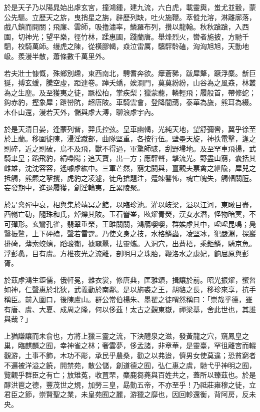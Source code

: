 \begin{pinyinscope}
於是天子乃以陽晁始出虖玄宮，撞鴻鍾，建九流，六白虎，載靈輿，蚩尤並轂，蒙公先驅。立歷天之旂，曳捎星之旃，辟歷列缺，吐火施鞭。萃傱允溶，淋離廓落，戲八鎮而開關；飛廉、雲師，吸撸潚率，鱗羅布列，攢以龍翰。秋秋蹌蹌，入西園，切神光；望平樂，徑竹林，蹂惠圃，踐蘭唐。舉烽烈火，轡者施披，方馳千駟，校騎萬師。缦虎之陳，從橫膠輵，猋泣雷厲，驞駍駖磕，洶洶旭旭，天動地岋。羨漫半散，蕭條數千萬里外。

若夫壯士慷慨，殊鄉別趣，東西南北，騁耆奔欲。癴蒼豨，跋犀犛，蹶浮麋。斮巨狿，搏玄蝯，騰空虛，距連卷。踔夭蟜，娭澗門，莫莫紛紛，山谷為之風猋，林叢為之生塵。及至獲夷之徒，蹶松柏，掌疾梨；獵蒙蘢，轔輕飛；履般首，帶修蛇；鉤赤豹，摼象犀；跇巒阬，超唐陂。車騎雲會，登降闇藹，泰華為旒，熊耳為綴。木仆山還，漫若天外，儲與虖大溥，聊浪虖宇內。

於是天清日晏，逢蒙列眥，羿氏控弦。皇車幽輵，光純天地，望舒彌轡，翼乎徐至於上蘭。移圍徙陳，浸淫蹴部，曲隊堅重，各按行伍。壁壘天旋，神抶電擊，逢之則碎，近之則破，鳥不及飛，獸不得過，軍驚師駭，刮野埽地。及至罕車飛揚，武騎聿皇；蹈飛豹，絹嘄陽；追天寶，出一方；應駍聲，擊流光。野盡山窮，囊括其雌雄，沈沈容容，遙噱虖紘中。三軍芒然，窮冘閼與，亶觀夫票禽之紲隃，犀兕之抵觸，熊羆之挐攫，虎豹之凌遽，徒角搶題注，蹙竦讋怖，魂亡魄失，觸輻關脰。妄發期中，進退履獲，創淫輪夷，丘累陵聚。

於是禽殫中衰，相與集於靖冥之館，以臨珍池。灌以岐梁，溢以江河，東瞰目盡，西暢亡劯，隨珠和氏，焯爍其陂。玉石嶜崟，眩燿青熒，漢女水潛，怪物暗冥，不可殫形。玄鸞孔雀，翡翠垂榮，王雎關關，鴻鴈嚶嚶，群娭虖其中，唣唣昆鳴；鳧鷖振鷺，上下砰磕，聲若雷霆。乃使文身之技，水格鱗蟲，凌堅冰，犯嚴淵，探巖排碕，薄索蛟螭，蹈骏獺，據黿鼉，抾靈蠵。入洞穴，出蒼梧，乘鉅鱗，騎京魚。浮彭蠡，目有虞。方椎夜光之流離，剖明月之珠胎，鞭洛水之虙妃，餉屈原與彭胥。

於茲虖鴻生鉅儒，俄軒冕，雜衣裳，修唐典，匡雅頌，揖讓於前。昭光振燿，蠁曶如神，仁聲惠於北狄，武義動於南鄰。是以旃裘之王，胡貉之長，移珍來享，抗手稱臣。前入圍口，後陳盧山。群公常伯楊朱、墨翟之徒喟然稱曰：「崇哉乎德，雖有唐、虞、大夏、成周之隆，何以侈茲！太古之覲東嶽，禪梁基，舍此世也，其誰與哉？」

上猶謙讓而未俞也，方將上獵三靈之流，下決醴泉之滋，發黃龍之穴，窺鳳皇之巢，臨麒麟之囿，幸神雀之林；奢雲夢，侈孟諸，非章華，是靈臺，罕徂離宮而輟觀游，土事不飾，木功不彫，承民乎農桑，勸之以弗迨，儕男女使莫違；恐貧窮者不遍被洋溢之饒，開禁苑，散公儲，創道德之囿，弘仁惠之虞，馳弋乎神明之囿，覽觀乎群臣之有亡；放雉菟，收罝罘，麋鹿芻蕘與百姓共之，蓋所以臻茲也。於是醇洪鬯之德，豐茂世之規，加勞三皇，勗勤五帝，不亦至乎！乃祗莊雍穆之徒，立君臣之節，崇賢聖之業，未皇苑囿之麗，游獵之靡也，因回軫還衡，背阿房，反未央。


\end{pinyinscope}
